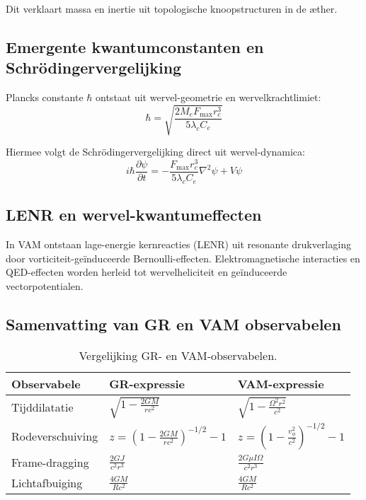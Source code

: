 Dit verklaart massa en inertie uit topologische knoopstructuren in de æther.

\subsection*{Emergente kwantumconstanten en Schrödingervergelijking}

Plancks constante $\hbar$ ontstaat uit wervel-geometrie en wervelkrachtlimiet:
\begin{equation}
    \hbar = \sqrt{\frac{2M_e F_{\max} r_c^3}{5 \lambda_c C_e}}
\end{equation}

Hiermee volgt de Schrödingervergelijking direct uit wervel-dynamica:
\begin{equation}
    i \hbar \frac{\partial \psi}{\partial t} = -\frac{F_{\max} r_c^3}{5 \lambda_c C_e}\nabla^2 \psi + V\psi
\end{equation}


\subsection*{LENR en wervel-kwantumeffecten}

In VAM ontstaan lage-energie kernreacties (LENR) uit resonante drukverlaging door vorticiteit-geïnduceerde Bernoulli-effecten. Elektromagnetische interacties en QED-effecten worden herleid tot wervelheliciteit en geïnduceerde vectorpotentialen.

\subsection*{Samenvatting van GR en VAM observabelen}

\begin{table}[h!]
    \centering
    \begin{tabular}{lll}
        \toprule
        \textbf{Observabele} & \textbf{GR-expressie} & \textbf{VAM-expressie} \\
        \midrule
        Tijddilatatie & $\sqrt{1-\frac{2GM}{rc^2}}$ & $\sqrt{1-\frac{\Omega^2 r^2}{c^2}}$\\[0.5em]
        Rodeverschuiving & $z=\left(1-\frac{2GM}{rc^2}\right)^{-1/2}-1$ & $z=\left(1-\frac{v_\phi^2}{c^2}\right)^{-1/2}-1$\\[0.5em]
        Frame-dragging & $\frac{2GJ}{c^2 r^3}$ & $\frac{2G\mu I\Omega}{c^2 r^3}$\\[0.5em]
        Lichtafbuiging & $\frac{4GM}{Rc^2}$ & $\frac{4GM}{Rc^2}$\\
        \bottomrule
    \end{tabular}
    \caption{Vergelijking GR- en VAM-observabelen.}
    \label{tab:vergelijkingen}
\end{table}